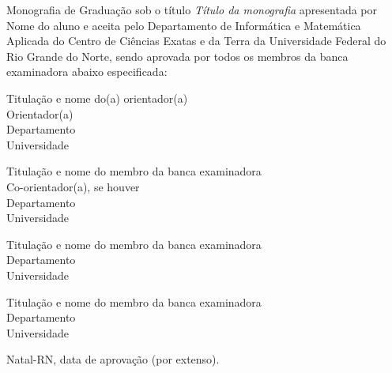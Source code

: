 \begin{folhadeaprovacao}
	\setlength{\ABNTsignthickness}{0.4pt}
	\setlength{\ABNTsignwidth}{10cm}
	
	\noindent 
	Monografia de Graduação sob o título \textit{Título da monografia} apresentada por 
	Nome do aluno e aceita pelo Departamento de Informática e Matemática Aplicada do
	Centro de Ciências Exatas e da Terra da Universidade Federal do Rio Grande do Norte,
	sendo aprovada por todos os membros da banca examinadora abaixo especificada:
		
	\assinatura
	{
		Titulação e nome do(a) orientador(a)\\
		{\small Orientador(a)} \\ 
		{\footnotesize
			Departamento \\
		  	Universidade
		}
	}
	
	\assinatura
	{
		Titulação e nome do membro da banca examinadora	\\
		{\small Co-orientador(a), se houver}\\ 
		{\footnotesize
			Departamento\\
		  	Universidade
		}
	}
		
	\assinatura
	{
		Titulação e nome do membro da banca examinadora\\ 
		{\footnotesize
			Departamento\\
		  	Universidade
		}
	}
		
	\assinatura
	{
		Titulação e nome do membro da banca examinadora\\ 
		{\footnotesize
			Departamento\\
		  	Universidade
		}
	}
		
	\vfill
	
	\begin{center}
		Natal-RN, data de aprovação (por extenso).
	\end{center}
\end{folhadeaprovacao}
